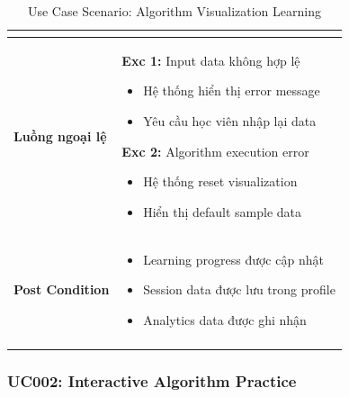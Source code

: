 \begin{longtable}{| p{3cm} | p{10cm} |}
\begin{itemize}
\end{itemize} \\ \hline
\textbf{Luồng ngoại lệ} & 
\textbf{Exc 1:} Input data không hợp lệ
\begin{itemize}
    \item Hệ thống hiển thị error message
    \item Yêu cầu học viên nhập lại data
\end{itemize}
\textbf{Exc 2:} Algorithm execution error
\begin{itemize}
    \item Hệ thống reset visualization
    \item Hiển thị default sample data
\end{itemize} \\ \hline
\textbf{Post Condition} & 
\begin{itemize}
    \item Learning progress được cập nhật
    \item Session data được lưu trong profile
    \item Analytics data được ghi nhận
\end{itemize} \\ \hline
\caption{Use Case Scenario: Algorithm Visualization Learning}
\label{tab:uc001} \\
\end{longtable}

\subsubsection{UC002: Interactive Algorithm Practice}

